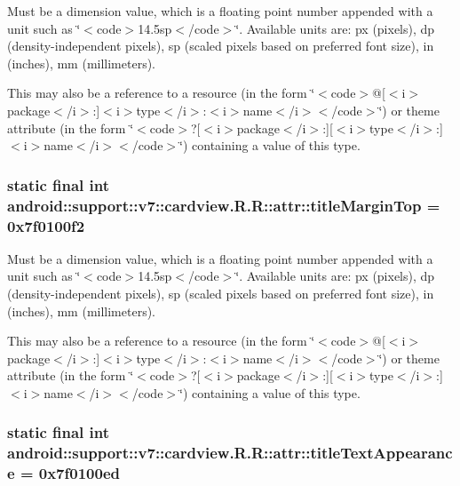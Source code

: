 Must be a dimension value, which is a floating point number appended with a unit such as \char`\"{}$<$code$>$14.5sp$<$/code$>$\char`\"{}. Available units are: px (pixels), dp (density-independent pixels), sp (scaled pixels based on preferred font size), in (inches), mm (millimeters). 

This may also be a reference to a resource (in the form \char`\"{}$<$code$>$@\mbox{[}$<$i$>$package$<$/i$>$:\mbox{]}$<$i$>$type$<$/i$>$:$<$i$>$name$<$/i$>$$<$/code$>$\char`\"{}) or theme attribute (in the form \char`\"{}$<$code$>$?\mbox{[}$<$i$>$package$<$/i$>$:\mbox{]}\mbox{[}$<$i$>$type$<$/i$>$:\mbox{]}$<$i$>$name$<$/i$>$$<$/code$>$\char`\"{}) containing a value of this type. \hypertarget{classandroid_1_1support_1_1v7_1_1cardview_1_1_r_1_1attr_4371ab2e0c11769021a8cf641312dedd}{
\subsubsection[{titleMarginTop}]{\setlength{\rightskip}{0pt plus 5cm}static final int android::support::v7::cardview.R.R::attr::titleMarginTop = 0x7f0100f2}}
\label{classandroid_1_1support_1_1v7_1_1cardview_1_1_r_1_1attr_4371ab2e0c11769021a8cf641312dedd}


Must be a dimension value, which is a floating point number appended with a unit such as \char`\"{}$<$code$>$14.5sp$<$/code$>$\char`\"{}. Available units are: px (pixels), dp (density-independent pixels), sp (scaled pixels based on preferred font size), in (inches), mm (millimeters). 

This may also be a reference to a resource (in the form \char`\"{}$<$code$>$@\mbox{[}$<$i$>$package$<$/i$>$:\mbox{]}$<$i$>$type$<$/i$>$:$<$i$>$name$<$/i$>$$<$/code$>$\char`\"{}) or theme attribute (in the form \char`\"{}$<$code$>$?\mbox{[}$<$i$>$package$<$/i$>$:\mbox{]}\mbox{[}$<$i$>$type$<$/i$>$:\mbox{]}$<$i$>$name$<$/i$>$$<$/code$>$\char`\"{}) containing a value of this type. \hypertarget{classandroid_1_1support_1_1v7_1_1cardview_1_1_r_1_1attr_0a3dca87cbe688d54cba1db014c9fd83}{
\subsubsection[{titleTextAppearance}]{\setlength{\rightskip}{0pt plus 5cm}static final int android::support::v7::cardview.R.R::attr::titleTextAppearance = 0x7f0100ed}}
\label{classandroid_1_1support_1_1v7_1_1cardview_1_1_r_1_1attr_0a3dca87cbe688d54cba1db014c9fd83}



